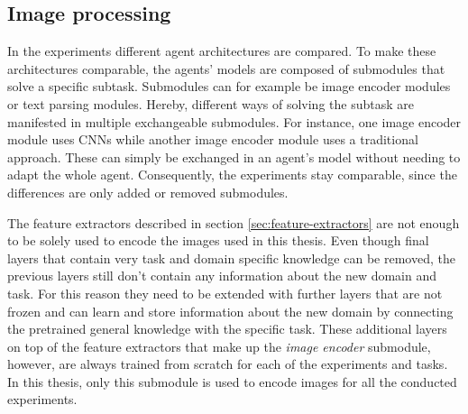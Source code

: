 
\subsection{Image processing}
\label{sec:image-processing}
In the experiments different agent architectures are compared.
To make these architectures comparable, the agents' models are composed of submodules that solve a specific subtask.
Submodules can for example be image encoder modules or text parsing modules.
Hereby, different ways of solving the subtask are manifested in multiple exchangeable submodules.
For instance, one image encoder module uses CNNs while another image encoder module uses a traditional approach.
These can simply be exchanged in an agent's model without needing to adapt the whole agent.
Consequently, the experiments stay comparable, since the differences are only added or removed submodules.

The feature extractors described in section \ref{sec:feature-extractors} are not enough to be solely used to encode the images used in this thesis.
Even though final layers that contain very task and domain specific knowledge can be removed, the previous layers still don't contain any information about the new domain and task.
For this reason they need to be extended with further layers that are not frozen and can learn and store information about the new domain by connecting the pretrained general knowledge with the specific task.
These additional layers on top of the feature extractors that make up the \emph{image encoder} submodule, however, are always trained from scratch for each of the experiments and tasks.
In this thesis, only this submodule is used to encode images for all the conducted experiments.

